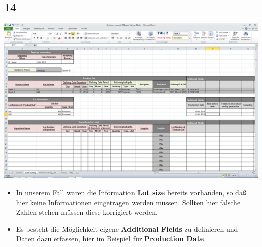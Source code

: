 \documentclass{beamer}
\begin{document}
\subsection{14}
\begin{frame}
	\begin{center}
  		\includegraphics[height=0.6\textheight]{14.png}
	\end{center}
	\begin{itemize}
		\item In unserem Fall waren die Information \textbf{Lot size} bereits vorhanden, so daß hier keine Informationen eingetragen werden müssen. Sollten hier falsche Zahlen stehen müssen diese korrigiert werden.
		\item Es besteht die Möglichkeit eigene \textbf{Additional Fields} zu definieren und Daten dazu erfassen, hier im Beispiel für \textbf{Production Date}.
	\end{itemize}
\end{frame}
\end{document}

